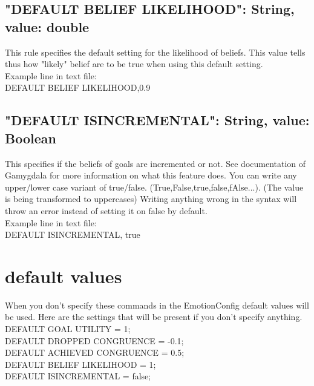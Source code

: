 \documentclass{scrartcl}
\begin{document}
\subsection*{"DEFAULT BELIEF LIKELIHOOD": String, value: double}
This rule specifies the default setting for the likelihood of beliefs. This value tells thus how "likely" belief are to be true when using this default setting.\\
Example line in text file:\\
DEFAULT BELIEF LIKELIHOOD,0.9\\

\subsection*{"DEFAULT ISINCREMENTAL": String, value: Boolean}
This specifies if the beliefs of goals are incremented or not. See documentation of Gamygdala for more information on what this feature does.
You can write any upper/lower case variant of true/false. (True,False,true,false,fAlse...). (The value is being transformed to uppercases)
Writing anything wrong in the syntax will throw an error instead of setting it on false by default.\\
Example line in text file:\\
DEFAULT ISINCREMENTAL, true\\

\pagebreak
\section*{default values}
When you don't specify these commands in the EmotionConfig default values will be used. Here are the settings that will be present if you don't specify anything.\\
DEFAULT GOAL UTILITY = 1;\\
DEFAULT DROPPED CONGRUENCE = -0.1;\\
DEFAULT ACHIEVED CONGRUENCE = 0.5;\\
DEFAULT BELIEF LIKELIHOOD = 1;\\
DEFAULT ISINCREMENTAL = false;\\
\end{document}
